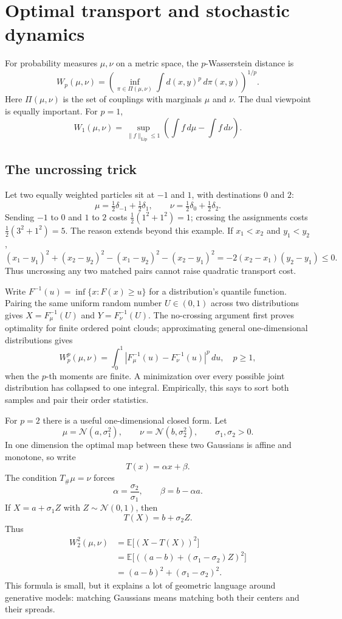 \section{Optimal transport and stochastic dynamics}

For probability measures $\mu,\nu$ on a metric space, the $p$-Wasserstein distance is
\[
  W_p(\mu,\nu)=\left(\inf_{\pi\in \Pi(\mu,\nu)}\int d(x,y)^p\,d\pi(x,y)\right)^{1/p}.
\]
Here $\Pi(\mu,\nu)$ is the set of couplings with marginals $\mu$ and $\nu$.  The dual viewpoint is equally important.  For $p=1$,
\[
  W_1(\mu,\nu)=\sup_{\|f\|_{\mathrm{Lip}}\le1}\left(\int f\,d\mu-\int f\,d\nu\right).
\]

\subsection*{The uncrossing trick}

Let two equally weighted particles sit at $-1$ and $1$, with destinations $0$ and $2$:
\[
 \mu=\tfrac12\delta_{-1}+\tfrac12\delta_1,
 \qquad\nu=\tfrac12\delta_0+\tfrac12\delta_2.
\]
Sending $-1$ to $0$ and $1$ to $2$ costs
$\tfrac12(1^2+1^2)=1$; crossing the assignments costs
$\tfrac12(3^2+1^2)=5$. The reason extends beyond this example. If $x_1<x_2$ and $y_1<y_2$,
\[
 (x_1-y_1)^2+(x_2-y_2)^2
 -(x_1-y_2)^2-(x_2-y_1)^2
 =-2(x_2-x_1)(y_2-y_1)\le0.
\]
Thus uncrossing any two matched pairs cannot raise quadratic transport cost.

Write $F^{-1}(u)=\inf\{x:F(x)\ge u\}$ for a distribution's quantile function. Pairing the same uniform random number $U\in(0,1)$ across two distributions gives
$X=F_\mu^{-1}(U)$ and $Y=F_\nu^{-1}(U)$. The no-crossing argument first proves optimality for finite ordered point clouds; approximating general one-dimensional distributions gives
\[
 \boxed{W_p^p(\mu,\nu)=
   \int_0^1|F_\mu^{-1}(u)-F_\nu^{-1}(u)|^p\,du,\quad p\ge1,}
\]
when the $p$-th moments are finite. A minimization over every possible joint distribution has collapsed to one integral. Empirically, this says to sort both samples and pair their order statistics.

For \(p=2\) there is a useful one-dimensional closed form.  Let
\[
  \mu=\mathcal N(a,\sigma_1^2),
  \qquad
  \nu=\mathcal N(b,\sigma_2^2),
  \qquad \sigma_1,\sigma_2>0.
\]
In one dimension the optimal map between these two Gaussians is affine and monotone, so write
\[
  T(x)=\alpha x+\beta.
\]
The condition \(T_\#\mu=\nu\) forces
\[
  \alpha=\frac{\sigma_2}{\sigma_1},
  \qquad
  \beta=b-\alpha a.
\]
If \(X=a+\sigma_1 Z\) with \(Z\sim\mathcal N(0,1)\), then
\[
  T(X)=b+\sigma_2 Z.
\]
Thus
\[
\begin{aligned}
  W_2^2(\mu,\nu)
  &=\mathbb E\bigl[(X-T(X))^2\bigr]\\
  &=\mathbb E\bigl[((a-b)+(\sigma_1-\sigma_2)Z)^2\bigr]\\
  &=(a-b)^2+(\sigma_1-\sigma_2)^2.
\end{aligned}
\]
This formula is small, but it explains a lot of geometric language around generative models: matching Gaussians means matching both their centers and their spreads.

